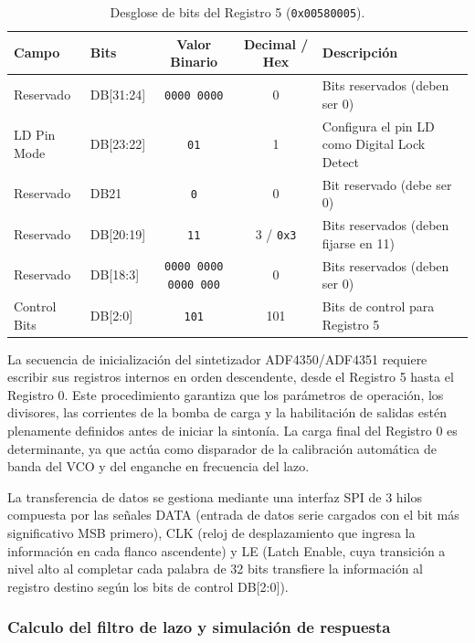 \documentclass[11pt,a4paper,twoside]{report}
\begin{document}
	\begin{table}[htbp]
		\centering
		\begin{tabularx}{\textwidth}{l l c c X}
			\toprule
			\textbf{Campo} & \textbf{Bits} & \textbf{Valor Binario} & \textbf{Decimal / Hex} & \textbf{Descripción} \\
			\midrule
			Reservado & DB[31:24] & \texttt{0000 0000} & 0 & Bits reservados (deben ser 0) \\
			LD Pin Mode & DB[23:22] & \texttt{01} & 1 & Configura el pin LD como Digital Lock Detect \\
			Reservado & DB21 & \texttt{0} & 0 & Bit reservado (debe ser 0) \\
			Reservado & DB[20:19] & \texttt{11} & 3 / \texttt{0x3} & Bits reservados (deben fijarse en 11) \\
			Reservado & DB[18:3] & \texttt{0000 0000 0000 000} & 0 & Bits reservados (deben ser 0) \\
			Control Bits & DB[2:0] & \texttt{101} & 101 & Bits de control para Registro 5 \\
			\bottomrule
		\end{tabularx}
		\caption{Desglose de bits del Registro 5 (\texttt{0x00580005}).}
		\label{tab:adf4350_reg5}
	\end{table}
	
	La secuencia de inicialización del sintetizador ADF4350/ADF4351 requiere escribir sus registros internos en orden descendente, desde el Registro 5 hasta el Registro 0. Este procedimiento garantiza que los parámetros de operación, los divisores, las corrientes de la bomba de carga y la habilitación de salidas estén plenamente definidos antes de iniciar la sintonía. La carga final del Registro 0 es determinante, ya que actúa como disparador de la calibración automática de banda del VCO y del enganche en frecuencia del lazo. 
	
	La transferencia de datos se gestiona mediante una interfaz SPI de 3 hilos compuesta por las señales DATA (entrada de datos serie cargados con el bit más significativo MSB primero), CLK (reloj de desplazamiento que ingresa la información en cada flanco ascendente) y LE (Latch Enable, cuya transición a nivel alto al completar cada palabra de 32 bits transfiere la información al registro destino según los bits de control DB[2:0]).
	
	\subsubsection{Calculo del filtro de lazo y simulación de respuesta}
	
\end{document}
